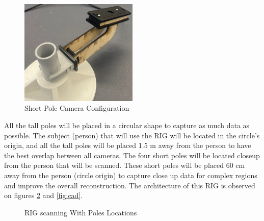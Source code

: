 \documentclass[12pt]{report}
\begin{document}
\begin{figure}[H]
  \hspace*{0.8cm}  
  \includegraphics[width=0.5\textwidth]{IMG_5896_cropped.jpg}
  \captionsetup{singlelinecheck = false, format= hang, justification=raggedright,  labelsep=space}
 \caption{Short Pole Camera Configuration}
 \label{fig:short_pole} 
\end{figure}

All the tall poles will be placed in a circular shape to capture as much data as possible. 
The subject (person) that will use the RIG will be located in the circle's origin, and all the tall poles will be placed 1.5 m away from the person to have the best overlap between all cameras.
The four short poles will be located closeup from the person that will be scanned. These short poles will be placed 60 cm away from the person (circle origin) to capture close up data for complex regions and improve the overall reconstruction.
The architecture of this RIG is observed on figures \ref{fig:RIG}  and \ref{fig:cad}.
\enlargethispage{\baselineskip}

\newpage

\begin{figure}[H]
  \centering
  \qquad
  \caption{RIG scanning With Poles Locations}
  \label{fig:RIG}
\end{figure}
\end{document}
